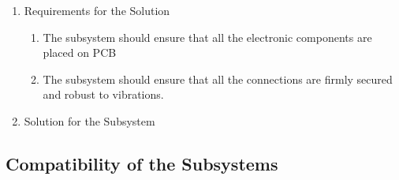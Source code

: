 \documentclass[a4paper,12pt]{article}
\begin{document}
	\begin{enumerate}
		\item {Requirements for the Solution}
		
		\begin{enumerate}
			\item The subsystem should ensure that all the electronic components are placed on PCB
			\item The subsystem should ensure that all the connections are firmly secured and robust to vibrations.
		\end{enumerate} 

	\item {Solution for the Subsystem}




	\end{enumerate}	




\subsection{Compatibility of the Subsystems}

\end{document}
